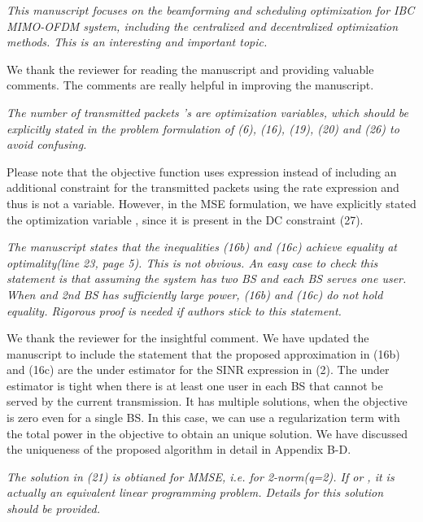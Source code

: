 \textit{This manuscript focuses on the beamforming and scheduling optimization for IBC MIMO-OFDM system, including the centralized and decentralized optimization methods. This is an interesting and important topic.}

We thank the reviewer for reading the manuscript and providing valuable comments. The comments are really helpful in improving the manuscript.

\begin{itemize}

 \textit{The number of transmitted packets 's are optimization variables, which should be explicitly stated in the problem formulation of (6), (16), (19), (20) and (26) to avoid confusing.}

\resp Please note that the objective function uses  expression instead of including an additional constraint for the transmitted packets using the rate expression and thus  is not a variable. However, in the MSE formulation, we have explicitly stated the optimization variable , since it is present in the DC constraint (27).

 \textit{The manuscript states that the inequalities (16b) and (16c) achieve equality at optimality(line 23, page 5). This is not obvious. An easy case to check this statement is that assuming the system has two BS and each BS serves one user. When  and 2nd BS has sufficiently large power, (16b) and (16c) do not hold equality. Rigorous proof is needed if authors stick to this statement.}

\resp We thank the reviewer for the insightful comment. We have updated the manuscript to include the statement that the proposed approximation in (16b) and (16c) are the under estimator for the SINR expression in (2). The under estimator is tight when there is at least one user in each BS that cannot be served by the current transmission. It has multiple solutions, when the objective is zero even for a single BS. In this case, we can use a regularization term with the total power in the objective to obtain an unique solution. We have discussed the uniqueness of the proposed algorithm in detail in Appendix B-D.

 \textit{The solution in (21) is obtianed for MMSE, i.e. for 2-norm(q=2). If  or , it is actually an equivalent linear programming problem. Details for this solution should be provided.}


\end{itemize}
